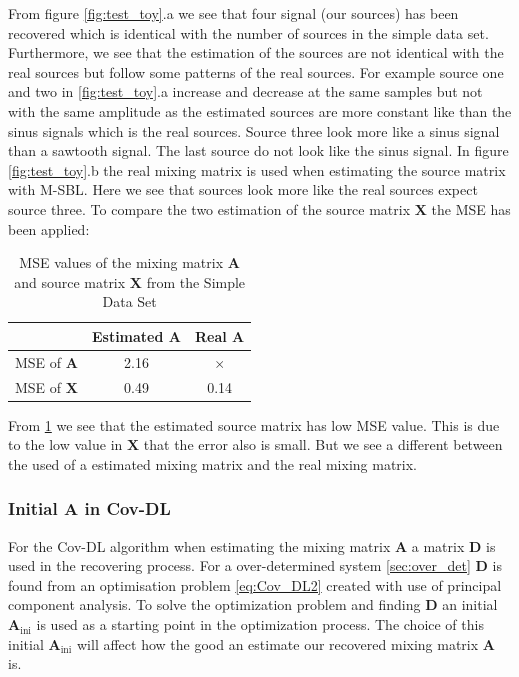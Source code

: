 \noindent
From figure \ref{fig:test_toy}.a we see that four signal (our sources) has been recovered which is identical with the number of sources in the simple data set. Furthermore, we see that the estimation of the sources are not identical with the real sources but follow some patterns of the real sources. For example source one and two in \ref{fig:test_toy}.a increase and decrease at the same samples but not with the same amplitude as the estimated sources are more constant like than the sinus signals which is the real sources. Source three look more like a sinus signal than a sawtooth signal. The last source do not look like the sinus signal.
In figure \ref{fig:test_toy}.b the real mixing matrix is used when estimating the source matrix with M-SBL. Here we see that sources look more like the real sources expect source three.
To compare the two estimation of the source matrix $\mathbf{X}$ the MSE has been applied:
\begin{table}[H]
\centering
\begin{tabular}{|c|c|c|}
\hline
         & Estimated $\mathbf{A}$ & Real $\mathbf{A}$ \\ \hline
MSE of $\mathbf{A}$ & 2.16 & $\times$ \\ 
\hline 
MSE of $\mathbf{X}$ & 0.49 & 0.14 \\ 
\hline
\end{tabular} 
\caption{MSE values of the mixing matrix $\mathbf{A}$ and source matrix $\mathbf{X}$ from the Simple Data Set}
\label{tab:test}
\end{table}
\noindent
From \ref{tab:test} we see that the estimated source matrix has low MSE value. This is due to the low value in $\mathbf{X}$ that the error also is small. But we see a different between the used of a estimated mixing matrix and the real mixing matrix.

\subsubsection{Initial A in Cov-DL}
For the Cov-DL algorithm when estimating the mixing matrix $\mathbf{A}$ a matrix $\mathbf{D}$ is used in the recovering process. For a over-determined system \ref{sec:over_det} $\mathbf{D}$ is found from an optimisation problem \eqref{eq:Cov_DL2} created with use of principal component analysis. To solve the optimization problem and finding $\mathbf{D}$ an initial $\mathbf{A}_{\text{ini}}$ is used as a starting point in the optimization process. The choice of this initial $\mathbf{A}_{\text{ini}}$ will affect how the good an estimate our recovered mixing matrix $\mathbf{A}$ is.


